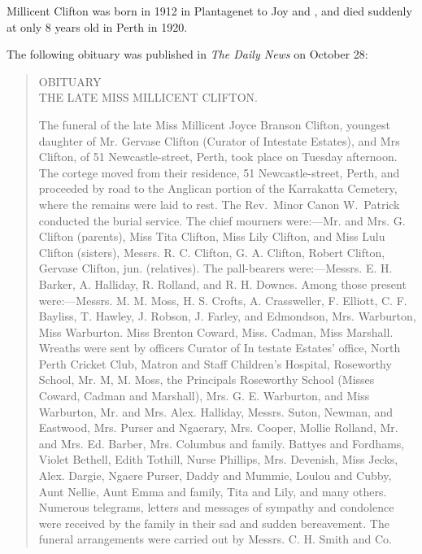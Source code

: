 
Millicent Clifton was born in 1912 in Plantagenet\cite{MJBCbirth}
to Joy and , and died suddenly at only 8 years old in Perth in 1920.\cite{MJBCdeath}

The following obituary was published in \emph{The Daily News} on October 28:\cite{MJBCobit}

\begin{quotation}
\begin{center}
OBITUARY \\
THE LATE MISS MILLICENT CLIFTON.
\end{center}

The funeral of the late Miss Millicent Joyce Branson Clifton, youngest daughter of Mr. Gervase Clifton (Curator of Intestate Estates),
and Mrs Clifton, of 51 Newcastle-street, Perth, took place on Tuesday afternoon. The cortege moved from their residence, 51 Newcastle-street,
Perth, and proceeded by road to the Anglican portion of the Karrakatta Cemetery, where the remains were laid to rest.
The Rev.\ Minor Canon W.\ Patrick conducted the burial service. The chief mourners were:---Mr. and Mrs. G. Clifton (parents),
Miss Tita Clifton, Miss Lily Clifton, and Miss Lulu Clifton (sisters), Messrs. R. C. Clifton, G. A. Clifton, Robert Clifton, Gervase Clifton, jun. (relatives). The pall-bearers were:---Messrs. E. H. Barker, A. Halliday, R. Rolland, and R. H. Downes. Among those present were:---Messrs. M. M. Moss, H. S. Crofts, A. Crassweller, F. Elliott, C. F. Bayliss, T. Hawley, J. Robson, J. Farley, and Edmondson, Mrs. Warburton, Miss Warburton. Miss Brenton Coward, Miss. Cadman, Miss Marshall. Wreaths were sent by officers Curator of In testate Estates' office, North Perth Cricket Club, Matron and Staff Children's Hospital, Roseworthy School, Mr. M, M. Moss, the Principals Roseworthy School (Misses Coward, Cadman and Marshall), Mrs. G. E. Warburton, and Miss Warburton, Mr. and Mrs. Alex. Halliday, Messrs. Suton, Newman, and Eastwood, Mrs. Purser and Ngaerary, Mrs. Cooper, Mollie Rolland, Mr. and Mrs. Ed. Barber, Mrs. Columbus and family. Battyes and Fordhams, Violet Bethell, Edith Tothill, Nurse Phillips, Mrs. Devenish, Miss Jecks, Alex. Dargie, Ngaere Purser, Daddy and Mummie, Loulou and Cubby, Aunt Nellie, Aunt Emma and family, Tita and Lily, and many others. Numerous telegrams, letters and messages of sympathy and condolence were received by the family in their sad and sudden bereavement. The funeral arrangements were carried out by Messrs. C. H. Smith and Co.
\end{quotation}
